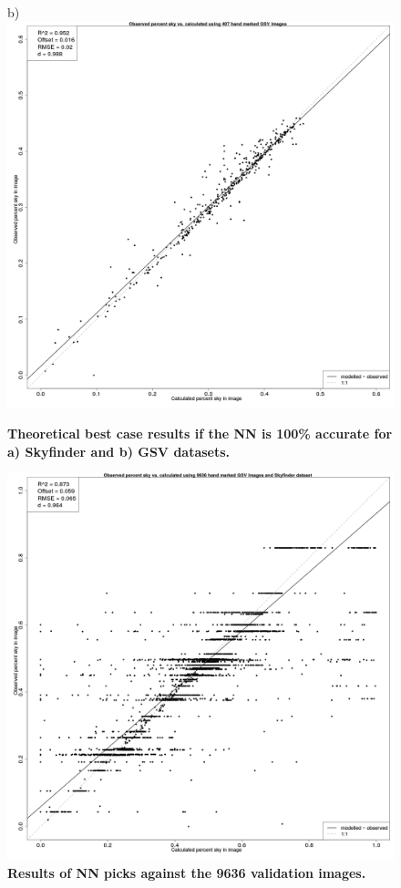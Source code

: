 \documentclass[final,3p,times,authoryear]{elsarticle}
\begin{document}
\begin{figure}
b)\includegraphics[scale=0.12]{Images/ErrorPlots2.png}
\caption{\textbf{Theoretical best case results if the NN is 100\% accurate for a) Skyfinder and b) GSV datasets.}}
\label{fig:errorplots}
\end{figure}


\begin{figure}
\centering
\includegraphics[scale=0.12]{Images/ErrorPlotsCNTK.png}
\caption{\textbf{Results of NN picks against the 9636 validation images.}}
\label{fig:errorplotscntk}
\end{figure}
\end{document}
